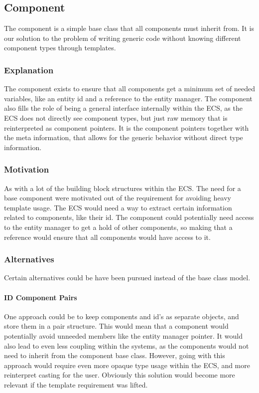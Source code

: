 \subsection{Component}
\label{subsec:detailed_component}
The component is a simple base class that all components must inherit from.
It is our solution to the problem of writing generic code without knowing different component
types through templates.

\subsubsection{Explanation}
The component exists to ensure that all components get a minimum set of needed
variables, like an entity id and a reference to the entity manager.
The component also fills the role of being a general interface
internally within the ECS, as the ECS does not directly see component types,
but just raw memory that is reinterpreted as component pointers.
It is the component pointers together with the meta information,
that allows for the generic behavior without direct type information.

\subsubsection{Motivation}
As with a lot of the building block structures within the ECS. The need for a base component
were motivated out of the requirement for avoiding heavy template usage.
The ECS would need a way to extract certain information related to components,
like their id. The component could potentially need access to the entity manager
to get a hold of other components, so making that a reference
would ensure that all components would have access to it.

\subsubsection{Alternatives}
Certain alternatives could be have been pursued instead of the base class model.

\paragraph{ID Component Pairs}
One approach could be to keep components and id's as separate objects, and store them in a pair structure.
This would mean that a component would potentially avoid unneeded members like the entity manager pointer.
It would also lead to even less coupling within the systems,
as the components would not need to inherit from the component base class.
However, going with this approach would require even more opaque type usage within the ECS,
and more reinterpret casting for the user.
Obviously this solution would become more relevant if the template requirement was lifted.

